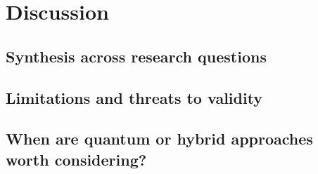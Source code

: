 \chapter{Discussion}
\label{ch:discussion}


\section{Synthesis across research questions}

\section{Limitations and threats to validity}

\section{When are quantum or hybrid approaches worth considering?}
